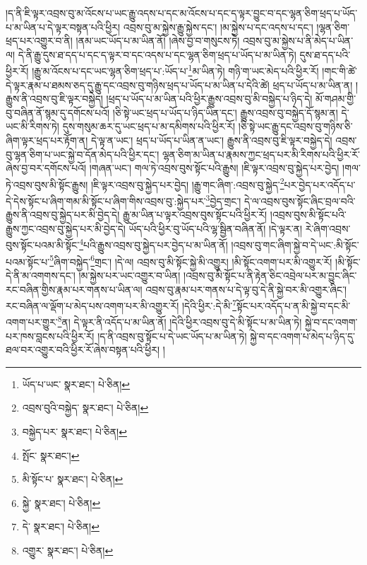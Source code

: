།ད་ནི་ཇི་ལྟར་འབྲས་བུ་མ་འོངས་པ་ཡང་རྒྱུ་འདས་པ་དང་མ་འོངས་པ་དང་ད་ལྟར་བྱུང་བ་དང་ལྷན་ཅིག་ཕྲད་པ་ཡོད་པ་མ་ཡིན་པ་དེ་ལྟར་བསྟན་པའི་ཕྱིར། འབྲས་བུ་མ་སྐྱེས་རྒྱུ་སྐྱེས་དང་། །མ་སྐྱེས་པ་དང་འདས་པ་དང་། །ལྷན་ཅིག་ཕྲད་པར་འགྱུར་བ་ནི། །ནམ་ཡང་ཡོད་པ་མ་ཡིན་ནོ། །ཞེས་བྱ་བ་གསུངས་ཏེ། འབྲས་བུ་མ་སྐྱེས་པ་ནི་མེད་པ་ཡིན་ལ། དེ་ནི་རྒྱུ་དུས་ཐ་དད་པ་དང་ད་ལྟར་བ་དང་འདས་པ་དང་ལྷན་ཅིག་ཕྲད་པ་ཡོད་པ་མ་ཡིན་ཏེ། དུས་ཐ་དད་པའི་ཕྱིར་རོ། །རྒྱུ་མ་འོངས་པ་དང་ཡང་ལྷན་ཅིག་ཕྲད་པ་:ཡོད་པ་\footnote{ཡོད་པ་ཡང་  སྣར་ཐང་།  པེ་ཅིན། }མ་ཡིན་ཏེ། གཉི་ག་ཡང་མེད་པའི་ཕྱིར་རོ། །གང་གི་ཚེ་དེ་ལྟར་རྣམ་པ་ཐམས་ཅད་དུ་རྒྱུ་དང་འབྲས་བུ་གཉིས་ཕྲད་པ་ཡོད་པ་མ་ཡིན་པ་དེའི་ཚེ། ཕྲད་པ་ཡོད་པ་མ་ཡིན་ན། །རྒྱུས་ནི་འབྲས་བུ་ཇི་ལྟར་བསྐྱེད། །ཕྲད་པ་ཡོད་པ་མ་ཡིན་པའི་ཕྱིར་རྒྱུས་འབྲས་བུ་མི་བསྐྱེད་པ་ཉིད་དེ། མོ་གཤམ་གྱི་བུ་བཞིན་ནོ་སྙམ་དུ་དགོངས་པའོ། །ཅི་སྟེ་ཡང་ཕྲད་པ་ཡོད་པ་ཉིད་ཡིན་དང་། རྒྱུས་འབྲས་བུ་བསྐྱེད་དོ་སྙམ་ན། དེ་ཡང་མི་རིགས་ཏེ། དུས་གསུམ་ཆར་དུ་ཡང་ཕྲད་པ་མ་དམིགས་པའི་ཕྱིར་རོ། །ཅི་སྟེ་ཡང་རྒྱུ་དང་འབྲས་བུ་གཉིས་ཅི་ཞིག་ལྟར་ཕྲད་པར་རྟོག་ན། དེ་ལྟ་ན་ཡང་། ཕྲད་པ་ཡོད་པ་ཡིན་ན་ཡང་། རྒྱུས་ནི་འབྲས་བུ་ཇི་ལྟར་བསྐྱེད་དེ། འབྲས་བུ་ལྷན་ཅིག་པ་ཡང་སྐྱེ་བ་དོན་མེད་པའི་ཕྱིར་དང་། ལྷན་ཅིག་མ་ཡིན་པ་རྣམས་ཀྱང་ཕྲད་པར་མི་རིགས་པའི་ཕྱིར་རོ་ཞེས་བྱ་བར་དགོངས་པའོ། །གཞན་ཡང་། གལ་ཏེ་འབྲས་བུས་སྟོང་པའི་རྒྱུས། །ཇི་ལྟར་འབྲས་བུ་སྐྱེད་པར་བྱེད། །གལ་ཏེ་འབྲས་བུས་མི་སྟོང་རྒྱུས། །ཇི་ལྟར་འབྲས་བུ་སྐྱེད་པར་བྱེད། །རྒྱུ་གང་ཞིག་:འབྲས་བུ་སྐྱེད་\footnote{འབྲས་བུའི་བསྐྱེད་  སྣར་ཐང་།  པེ་ཅིན། }པར་བྱེད་པར་འདོད་པ་དེ་དེས་སྟོང་པ་ཞིག་གམ་མི་སྟོང་པ་ཞིག་གིས་འབྲས་བུ་:སྐྱེད་པར་\footnote{བསྐྱེད་པར་  སྣར་ཐང་།  པེ་ཅིན། }བྱེད་གྲང་། དེ་ལ་འབྲས་བུས་སྟོང་ཞིང་བྲལ་བའི་རྒྱུས་ནི་འབྲས་བུ་སྐྱེད་པར་མི་བྱེད་དེ། རྒྱུ་མ་ཡིན་པ་ལྟར་འབྲས་བུས་སྟོང་པའི་ཕྱིར་རོ། །འབྲས་བུས་མི་སྟོང་པའི་རྒྱུས་ཀྱང་འབྲས་བུ་སྐྱེད་པར་མི་བྱེད་དེ། ཡོད་པའི་ཕྱིར་བུ་ཡོད་པའི་ལྷ་སྦྱིན་བཞིན་ནོ། །དེ་ལྟར་ན། རེ་ཞིག་འབྲས་བུས་སྟོང་པའམ་མི་སྟོང་\footnote{སྤོང་  སྣར་ཐང་། }པའི་རྒྱུས་འབྲས་བུ་སྐྱེད་པར་བྱེད་པ་མ་ཡིན་ནོ། །འབྲས་བུ་གང་ཞིག་སྐྱེ་བ་དེ་ཡང་:མི་སྟོང་པའམ་སྟོང་པ་\footnote{མི་སྟོང་པ་  སྣར་ཐང་།  པེ་ཅིན། }ཞིག་བསྐྱེད་\footnote{སྐྱེ་  སྣར་ཐང་།  པེ་ཅིན། }གྲང་། །དེ་ལ། འབྲས་བུ་མི་སྟོང་སྐྱེ་མི་འགྱུར། །མི་སྟོང་འགག་པར་མི་འགྱུར་རོ། །མི་སྟོང་དེ་ནི་མ་འགགས་དང་། །མ་སྐྱེས་པར་ཡང་འགྱུར་བ་ཡིན། །འབྲས་བུ་མི་སྟོང་པ་ནི་རྟེན་ཅིང་འབྲེལ་པར་མ་བྱུང་ཞིང་རང་བཞིན་གྱིས་རྣམ་པར་གནས་པ་ཡིན་ལ། འབྲས་བུ་རྣམ་པར་གནས་པ་དེ་ལྟ་བུ་དེ་ནི་སྐྱེ་བར་མི་འགྱུར་ཞིང་། རང་བཞིན་ལ་ལྡོག་པ་མེད་པས་འགག་པར་མི་འགྱུར་རོ། །དེའི་ཕྱིར་:དེ་མི་\footnote{དེ་  སྣར་ཐང་།  པེ་ཅིན། }སྟོང་པར་འདོད་པ་ན་མི་སྐྱེ་བ་དང་མི་འགག་པར་གྱུར་\footnote{འགྱུར་  སྣར་ཐང་།  པེ་ཅིན། }ན། དེ་ལྟར་ནི་འདོད་པ་མ་ཡིན་ནོ། །དེའི་ཕྱིར་འབྲས་བུ་དེ་མི་སྟོང་པ་མ་ཡིན་ཏེ། སྐྱེ་བ་དང་འགག་པར་ཁས་བླངས་པའི་ཕྱིར་རོ། །ད་ནི་འབྲས་བུ་སྟོང་པ་དེ་ཡང་ཡོད་པ་མ་ཡིན་ཏེ། སྐྱེ་བ་དང་འགག་པ་མེད་པ་ཉིད་དུ་ཐལ་བར་འགྱུར་བའི་ཕྱིར་རོ་ཞེས་བསྟན་པའི་ཕྱིར། །
